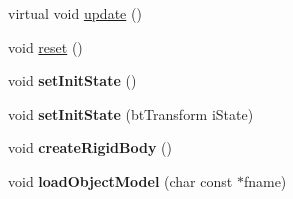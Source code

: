 \begin{DoxyCompactItemize}
\item 
virtual void \hyperlink{classbtosgObject_a342917817dfde62554f83da8e0d5110b}{update} ()
\item 
void \hyperlink{classbtosgObject_a93983f9180dd0672f8779cf2baa78580}{reset} ()
\item 
\mbox{\label{classbtosgObject_ad1508a0ce28cfac83e5f0ff6245f91b5}} 
void {\bfseries set\+Init\+State} ()
\item 
\mbox{\label{classbtosgObject_a6ceb08e59ee95acaaef389ee198d2b56}} 
void {\bfseries set\+Init\+State} (bt\+Transform i\+State)
\item 
\mbox{\label{classbtosgObject_a029dbe9134fa94e7355799f67fb2cd6d}} 
void {\bfseries create\+Rigid\+Body} ()
\item 
\mbox{\label{classbtosgObject_a91838b8235579da178fcc06e6d3d47f3}} 
void {\bfseries load\+Object\+Model} (char const $\ast$fname)
\end{DoxyCompactItemize}
